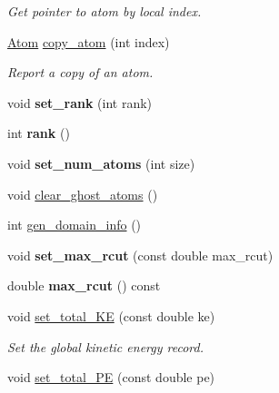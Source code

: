 \begin{DoxyCompactItemize}
\begin{DoxyCompactList}\small\item\em Get pointer to atom by local index. \end{DoxyCompactList}\item 
\hypertarget{classSystem_ad8a11a6960742e6265851f805f1e42ab}{\hyperlink{structAtom}{Atom} \hyperlink{classSystem_ad8a11a6960742e6265851f805f1e42ab}{copy\-\_\-atom} (int index)}\label{classSystem_ad8a11a6960742e6265851f805f1e42ab}

\begin{DoxyCompactList}\small\item\em Report a copy of an atom. \end{DoxyCompactList}\item 
\hypertarget{classSystem_a57997afb5d0cce89ab51e95d06d83972}{void {\bfseries set\-\_\-rank} (int rank)}\label{classSystem_a57997afb5d0cce89ab51e95d06d83972}

\item 
\hypertarget{classSystem_ac09723cae5531f826fb85b05b6ad5f2b}{int {\bfseries rank} ()}\label{classSystem_ac09723cae5531f826fb85b05b6ad5f2b}

\item 
\hypertarget{classSystem_ac33ec3abf09c300d1c080d36b206e966}{void {\bfseries set\-\_\-num\-\_\-atoms} (int size)}\label{classSystem_ac33ec3abf09c300d1c080d36b206e966}

\item 
void \hyperlink{classSystem_a3c598e8d2ca9bae20c78ef21759f3a12}{clear\-\_\-ghost\-\_\-atoms} ()
\item 
int \hyperlink{classSystem_ab7c96922f7c7da037044657f7edfd3e5}{gen\-\_\-domain\-\_\-info} ()
\item 
\hypertarget{classSystem_a8f661d16570bd451fa4b017c0eebdbb8}{void {\bfseries set\-\_\-max\-\_\-rcut} (const double max\-\_\-rcut)}\label{classSystem_a8f661d16570bd451fa4b017c0eebdbb8}

\item 
\hypertarget{classSystem_aebf96e8a2302ab4dd48cee8614f546c1}{double {\bfseries max\-\_\-rcut} () const }\label{classSystem_aebf96e8a2302ab4dd48cee8614f546c1}

\item 
\hypertarget{classSystem_ad6e5b77a96662d690db44852b80e7638}{void \hyperlink{classSystem_ad6e5b77a96662d690db44852b80e7638}{set\-\_\-total\-\_\-\-K\-E} (const double ke)}\label{classSystem_ad6e5b77a96662d690db44852b80e7638}

\begin{DoxyCompactList}\small\item\em Set the global kinetic energy record. \end{DoxyCompactList}\item 
\hypertarget{classSystem_a2da9018326f13e2ef9b66407234f6a5a}{void \hyperlink{classSystem_a2da9018326f13e2ef9b66407234f6a5a}{set\-\_\-total\-\_\-\-P\-E} (const double pe)}\label{classSystem_a2da9018326f13e2ef9b66407234f6a5a}


\end{DoxyCompactItemize}
